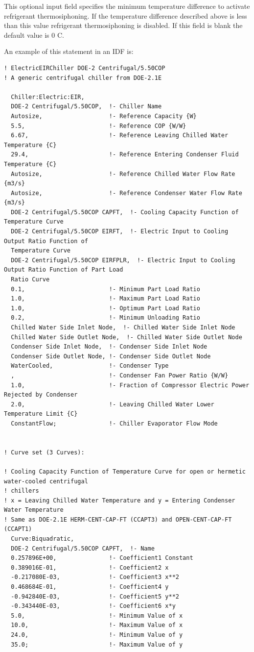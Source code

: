 This optional input field specifies the minimum temperature difference to activate refrigerant thermosiphoning. If the temperature difference described above is less than this value refrigerant thermosiphoning is disabled. If this field is blank the default value is 0 C.


An example of this statement in an IDF is:

\begin{lstlisting}
! ElectricEIRChiller DOE-2 Centrifugal/5.50COP
! A generic centrifugal chiller from DOE-2.1E

  Chiller:Electric:EIR,
  DOE-2 Centrifugal/5.50COP,  !- Chiller Name
  Autosize,                   !- Reference Capacity {W}
  5.5,                        !- Reference COP {W/W}
  6.67,                       !- Reference Leaving Chilled Water Temperature {C}
  29.4,                       !- Reference Entering Condenser Fluid Temperature {C}
  Autosize,                   !- Reference Chilled Water Flow Rate {m3/s}
  Autosize,                   !- Reference Condenser Water Flow Rate {m3/s}
  DOE-2 Centrifugal/5.50COP CAPFT,  !- Cooling Capacity Function of Temperature Curve
  DOE-2 Centrifugal/5.50COP EIRFT,  !- Electric Input to Cooling Output Ratio Function of
  Temperature Curve
  DOE-2 Centrifugal/5.50COP EIRFPLR,  !- Electric Input to Cooling Output Ratio Function of Part Load
  Ratio Curve
  0.1,                        !- Minimum Part Load Ratio
  1.0,                        !- Maximum Part Load Ratio
  1.0,                        !- Optimum Part Load Ratio
  0.2,                        !- Minimum Unloading Ratio
  Chilled Water Side Inlet Node,  !- Chilled Water Side Inlet Node
  Chilled Water Side Outlet Node,  !- Chilled Water Side Outlet Node
  Condenser Side Inlet Node,  !- Condenser Side Inlet Node
  Condenser Side Outlet Node, !- Condenser Side Outlet Node
  WaterCooled,                !- Condenser Type
  ,                           !- Condenser Fan Power Ratio {W/W}
  1.0,                        !- Fraction of Compressor Electric Power Rejected by Condenser
  2.0,                        !- Leaving Chilled Water Lower Temperature Limit {C}
  ConstantFlow;               !- Chiller Evaporator Flow Mode


! Curve set (3 Curves):

! Cooling Capacity Function of Temperature Curve for open or hermetic water-cooled centrifugal
! chillers
! x = Leaving Chilled Water Temperature and y = Entering Condenser Water Temperature
! Same as DOE-2.1E HERM-CENT-CAP-FT (CCAPT3) and OPEN-CENT-CAP-FT (CCAPT1)
  Curve:Biquadratic,
  DOE-2 Centrifugal/5.50COP CAPFT,  !- Name
  0.257896E+00,               !- Coefficient1 Constant
  0.389016E-01,               !- Coefficient2 x
  -0.217080E-03,              !- Coefficient3 x**2
  0.468684E-01,               !- Coefficient4 y
  -0.942840E-03,              !- Coefficient5 y**2
  -0.343440E-03,              !- Coefficient6 x*y
  5.0,                        !- Minimum Value of x
  10.0,                       !- Maximum Value of x
  24.0,                       !- Minimum Value of y
  35.0;                       !- Maximum Value of y



\end{lstlisting}

